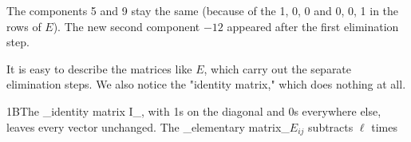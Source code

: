 The components 5 and 9 stay the same (because of the 1, 0, 0 and 0, 0, 1 in the rows of \(E\)). The new second component \(-12\) appeared after the first elimination step.

It is easy to describe the matrices like \(E\), which carry out the separate elimination steps. We also notice the "identity matrix," which does nothing at all.

1BThe _identity matrix I_, with 1s on the diagonal and 0s everywhere else, leaves every vector unchanged. The _elementary matrix_\(E_{ij}\) subtracts \(\ell\) times 